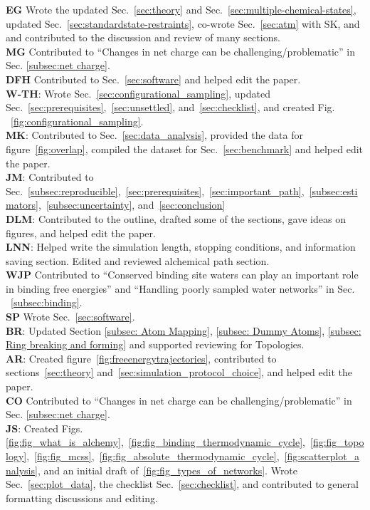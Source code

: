 \documentclass[9pt,bestpractices]{livecoms}
\begin{document}
\textbf{EG} Wrote the updated Sec.~\ref{sec:theory} and Sec.~\ref{sec:multiple-chemical-states},  updated Sec.~\ref{sec:standardstate-restraints}, co-wrote Sec.~\ref{sec:atm} with SK, and and contributed to the discussion and review of many sections.\\
\textbf{MG} Contributed to ``Changes in net charge can be challenging/problematic'' in Sec. \ref{subsec:net charge}. \\
\textbf{DFH} Contributed to Sec.~\ref{sec:software} and helped edit the paper. \\
\textbf{W-TH}: Wrote Sec.~\ref{sec:configurational_sampling}, updated Sec.~\ref{sec:prerequisites},~\ref{sec:unsettled}, and~\ref{sec:checklist}, and created Fig. ~\ref{fig:configurational_sampling}.\\
\textbf{MK}: Contributed to Sec.~\ref{sec:data_analysis}, provided the data for figure~\ref{fig:overlap}, compiled the dataset for Sec.~\ref{sec:benchmark} and helped edit the paper.\\
\textbf{JM}: Contributed to Sec.~\ref{subsec:reproducible},~\ref{sec:prerequisites},~\ref{sec:important_path},~\ref{subsec:estimators},~\ref{subsec:uncertainty}, and~\ref{sec:conclusion}\\
\textbf{DLM}: Contributed to the outline, drafted some of the sections, gave ideas on figures, and helped edit the paper.\\
\textbf{LNN}: Helped write the simulation length, stopping conditions, and information saving section. Edited and reviewed alchemical path section.\\
\textbf{WJP} Contributed to ``Conserved binding site waters can play an important role in binding free energies'' and ``Handling poorly sampled water networks'' in Sec. ~\ref{subsec:binding}.\\
\textbf{SP} Wrote Sec.~\ref{sec:software}. \\
\textbf{BR}: Updated Section \ref{subsec: Atom Mapping}, \ref{subsec: Dummy Atoms}, \ref{subsec: Ring breaking and forming} and supported reviewing for Topologies.\\
\textbf{AR}: Created figure~\ref{fig:freeenergytrajectories}, contributed to sections~\ref{sec:theory} and~\ref{sec:simulation_protocol_choice}, and helped edit the paper.\\
\textbf{CO} Contributed to ``Changes in net charge can be challenging/problematic'' in Sec. \ref{subsec:net charge}. \\
\textbf{JS}: Created Figs.~ \ref{fig:fig_what_is_alchemy},~\ref{fig:fig_binding_thermodynamic_cycle},~\ref{fig:fig_topology},~\ref{fig:fig_mcss},~\ref{fig:fig_absolute_thermodynamic_cycle},~\ref{fig:scatterplot_analysis}, and an initial draft of~\ref{fig:fig_types_of_networks}. Wrote Sec.~\ref{sec:plot_data}, the checklist Sec.~\ref{sec:checklist}, and contributed to general formatting discussions and editing.\\
\end{document}
